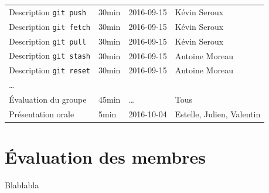 \documentclass[11pt,canadien]{article}
\begin{document}
\begin{appendices}
\begin{tabular}{l l l l}
	\\ Description \texttt{git push}        & 30min & 2016-09-15 & Kévin Seroux
	\\ Description \texttt{git fetch}       & 30min & 2016-09-15 & Kévin Seroux
	\\ Description \texttt{git pull}        & 30min & 2016-09-15 & Kévin Seroux
	\\ Description \texttt{git stash}       & 30min & 2016-09-15 & Antoine Moreau
	\\ Description \texttt{git reset}       & 30min & 2016-09-15 & Antoine Moreau
	\\ \ldots
	\\ Évaluation du groupe                 & 45min & \ldots     & Tous
	\\ Présentation orale                   & 5min  & 2016-10-04 & Estelle, Julien, Valentin
\end{tabular}

\newpage
\section{Évaluation des membres}
Blablabla

\end{appendices}
\end{document}

